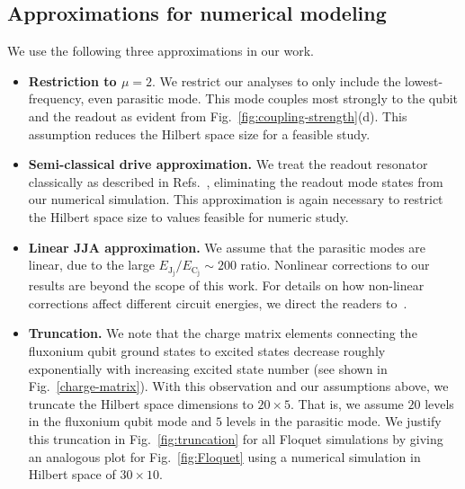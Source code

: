 \documentclass[%
reprint,
superscriptaddress,
 amsmath,amssymb,
 aps,
 prx,
longbibliography,
floatfix,
]{revtex4-2}
\begin{document}
\subsection{Approximations for numerical modeling}\label{app:numerics}
We use the following three approximations in our work.
\begin{itemize}
    \item \textbf{Restriction to $\mu=2$}. We restrict our analyses to only include the lowest-frequency, even parasitic mode. This mode couples most strongly to the qubit and the readout as evident from Fig.~\ref{fig:coupling-strength}(d). This assumption reduces the Hilbert space size for a feasible study. 

    \item \textbf{Semi-classical drive approximation.}  We treat the readout resonator classically as described in Refs.~\cite{xiao2023diagrammatic,dumas2024unified,cohen2023reminiscence,khezri2023measurement}, eliminating the readout mode states from our numerical simulation. This approximation is again necessary to restrict the Hilbert space size to values feasible for numeric study.
    
    \item \textbf{Linear JJA approximation.} We assume that the parasitic modes are linear, due to the large $E_{\textrm{J}_\textrm{j}}/E_{\textrm{C}_\textrm{j}} \sim 200$ ratio. Nonlinear corrections to our results are beyond the scope of this work. For details on how non-linear corrections affect different circuit energies, we direct the readers to~\cite{viola2015collective}. 
    \item \textbf{Truncation.} We note that the charge matrix elements connecting the fluxonium qubit ground states to excited states decrease roughly exponentially with increasing excited state number (see shown in Fig.~\ref{charge-matrix}). With this observation and our assumptions above, we truncate the Hilbert space dimensions to $20\times 5$. That is, we assume $20$ levels in the fluxonium qubit mode and $5$ levels in the parasitic mode. We justify this truncation in Fig.~\ref{fig:truncation} for all Floquet simulations by giving an analogous plot for Fig.~\ref{fig:Floquet} using a numerical simulation in Hilbert space of $30\times 10$.
    \end{itemize}
\end{document}

